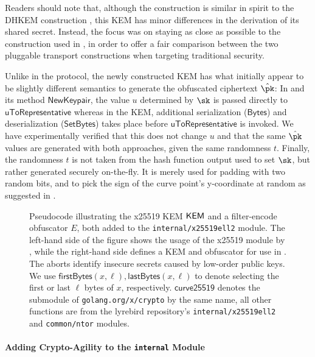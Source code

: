 Readers should note that, although the construction is similar in spirit to the DHKEM construction \cite[Section~4.1]{rfc9180}, this KEM has minor differences in the derivation of its shared secret. Instead, the focus was on staying as close as possible to the construction used in \obfsfour{}, in order to offer a fair comparison between the two pluggable transport constructions when targeting traditional security.

Unlike in the \obfsfour{} protocol, the newly constructed KEM has what initially appear to be slightly different semantics to generate the obfuscated ciphertext $\hat \pk$:
In \obfsfour{} and its method $\mathsf{NewKeypair}$, the value $u$ determined by $\sk$ is passed directly to $\mathsf{uToRepresentative}$ whereas in the KEM, additional serialization ($\mathsf{Bytes}$) and deserialization ($\mathsf{SetBytes}$) takes place before $\mathsf{uToRepresentative}$ is invoked.
We have experimentally verified that this does not change $u$ and that the same $\hat \pk$ values are generated with both approaches, given the same randomness $t$.
Finally, the randomness $t$ is not taken from the hash function output used to set $\sk$, but rather generated securely on-the-fly. It is merely used for padding with two random bits, and to pick the sign of the curve point's y-coordinate at random as suggested in \cite{elligatorExplicitFormulas}.

\begin{figure}
    
    \caption[
        Pseudocode illustrating the x25519 KEM and filter-encode obfuscator added to the \texttt{internal/x25519ell2} module.
    ]{
        Pseudocode illustrating the x25519 KEM $\mathsf{KEM}$ and a filter-encode obfuscator $E$, both added to the \texttt{internal/x25519ell2} module.
        The left-hand side of the figure shows the usage of the x25519 module by \obfsfour{}, while the right-hand side defines a KEM and obfuscator for use in \drivel{}.
        The aborts identify insecure secrets caused by low-order public keys.
        We use $\mathsf{firstBytes}(x, \ell), \mathsf{lastBytes}(x, \ell)$ to denote selecting the first or last $\ell$ bytes of $x$, respectively.
        $\mathsf{curve25519}$ denotes the submodule of \texttt{golang.org/x/crypto} by the same name, all other functions are from the lyrebird repository's \texttt{internal/x25519ell2} and \texttt{common/ntor} modules.
    }
    \label{fig:impl-x25519-kem}
\end{figure}

\paragraph{Adding Crypto-Agility to the \texttt{internal} Module}

